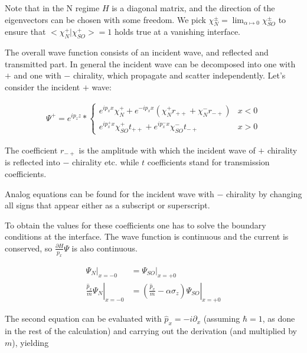 Note that in the N regime $H$ is a diagonal matrix, and the direction
of the eigenvectors can be chosen with some freedom. We pick
$\chi_N^{\pm} = \lim_{\alpha \mapsto 0} \chi_{SO}^{\pm}$ to ensure that
$<\chi_N^+|\chi_{SO}^+> = 1$ holds true at a vanishing interface.



The overall wave function consists of an incident wave, 
and reflected and transmitted part. In general the incident wave can
be decomposed into one with $+$ and one with $-$ chirality, which
propagate and scatter independently. Let's consider the incident $+$
wave:

\begin{align}
    \Psi^+ = e^{i p_z z} * \left\{
        \begin{array}{ll}
            e^{i p_x x} \chi_N^+ + e^{- i p_x x} (\chi_N^+ r_{++} +
                    \chi_N^- r_{-+})    & x < 0\\
            e^{i p_x^+ x} \chi_{SO}^+ t_{++} + e^{i p_x^- x}
            \chi_{SO}^- t_{-+}          & x > 0
        \end{array} \right.
\end{align}

The coefficient $r_{-+}$ is the amplitude with which the incident wave
of $+$ chirality is reflected into $-$ chirality etc. while $t$
coefficients stand for transmission coefficients.

Analog equations can be found for the incident wave with $-$ chirality
by changing all signs that appear either as a subscript or
superscript.

To obtain the values for these coefficients one has to solve the
boundary conditions at the interface. The wave function is continuous
and the current is conserved, so $\frac{\partial H}{p_x} \Psi$ is also
continuous.

\begin{align}
    \Psi_N|_{x = -0}    &= \Psi_{SO}|_{x = +0} \label{eq:continuous}\\
    \left.\frac{\hat p_x}{m} \Psi_N\right|_{x = -0}
                        &= \left. \left(\frac{\hat p_x}{m} -\alpha \sigma_z\right)
                                \Psi_{SO}\right|_{x = +0}
\end{align}

The second equation can be evaluated with $\hat p_x = -i \partial_x$
(assuming $\hbar = 1$, as done in the rest of the calculation) and
carrying out the derivation (and multiplied by $m$), yielding

